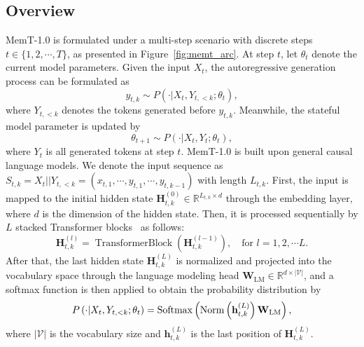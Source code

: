 \subsection{Overview}
MemT-1.0 is formulated under a multi-step scenario with discrete steps $t \in \{1,2, \cdots, T\}$, as presented in Figure~\ref{fig:memt_arc}.
At step $t$, let $\theta_t$ denote the current model parameters.
Given the input $X_t$, the autoregressive generation process can be formulated as
\begin{equation*}
    y_{t,k} \sim P \left( \cdot | X_t,Y_{t,<k} ; \theta_t \right),
\end{equation*}
where $Y_{t,<k}$ denotes the tokens generated before $y_{t,k}$.
Meanwhile, the stateful model parameter is updated by
\begin{equation*}
    \theta_{t+1} \sim P\left( \cdot | X_t,Y_t ; \theta_t \right),
\end{equation*}
where $Y_{t}$ is all generated tokens at step $t$.
MemT-1.0 is built upon general causal language models.
We denote the input sequence as $S_{t,k} = X_t||Y_{t,<k} = \left(x_{t,1}, \cdots, y_{t,1}, \cdots , y_{t,k-1}\right)$ with length $L_{t,k}$.
First, the input is mapped to the initial hidden state $\mathbf{H}^{(0)}_{t,k} \in \mathbb{R}^{L_{t,k} \times d}$ through the embedding layer, where $d$ is the dimension of the hidden state.
Then, it is processed sequentially by $L$ stacked Transformer blocks~\cite{vaswani2017attention} as follows:
\begin{equation*}
    \mathbf{H}^{(l)}_{t,k} = \operatorname{TransformerBlock}\left( \mathbf{H}^{(l-1)}_{t,k} \right), \quad \text{for $l=1, 2, \cdots L$}.
\end{equation*}
After that, the last hidden state $\mathbf{H}^{(L)}_{t,k}$ is normalized and projected into the vocabulary space through the language modeling head $\mathbf{W}_{\text{LM}} \in \mathbb{R}^{d \times |\mathcal{V}|}$, and a softmax function is then applied to obtain the probability distribution by
\begin{equation*}
    P \left( \cdot | X_t,Y_{t,<k} ; \theta_t \right) = \operatorname{Softmax} \left( \operatorname{Norm}\left( \mathbf{h}^{(L)}_{t,k} \right) \mathbf{W}_{\text{LM}} \right),
\end{equation*}
where $|\mathcal{V}|$ is the vocabulary size and $\mathbf{h}^{(L)}_{t,k}$ is the last position of $\mathbf{H}^{(L)}_{t,k}$.

